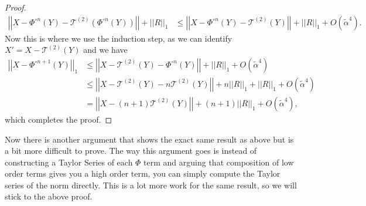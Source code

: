 \documentclass{article}
\newcommand{\norm}[1]{\left| \left| #1 \right| \right|}
\newcommand{\bigo}[1]{O\left( #1 \right)}
\begin{document}
\begin{proof}
\begin{align}
    \norm{X - \Phi^{\circ n}(Y) - \mathcal{T}^{(2)}(\Phi^{\circ n}(Y))} + \norm{R}_1 &\le \norm{X - \Phi^{\circ n}(Y) - \mathcal{T}^{(2)}(Y)} + \norm{R}_1 + \bigo{\widetilde{\alpha }^4}.
\end{align}
Now this is where we use the induction step, as we can identify $X' = X - \mathcal{T}^{(2)}(Y)$ and we have
\begin{align}
    \norm{X - \Phi^{\circ n + 1}(Y)}_1 &\le \norm{X - \mathcal{T}^{(2)}(Y) - \Phi^{\circ n}(Y) } + \norm{R}_1 + \bigo{\widetilde{\alpha }^4} \\
    &\le \norm{X - \mathcal{T}^{(2)}(Y) - n \mathcal{T}^{(2)}(Y)} + n \norm{R}_1 + \norm{R}_1 + \bigo{\widetilde{\alpha}^4} \\
    &=\norm{X - (n + 1) \mathcal{T}^{(2)}(Y)} + (n + 1) \norm{R}_1 + \bigo{\widetilde{\alpha}^4},
\end{align}
which completes the proof.
\end{proof}
Now there is another argument that shows the exact same result as above but is a bit more difficult to prove. The way this argument goes is instead of constructing a Taylor Series of each $\Phi$ term and arguing that composition of low order terms gives you a high order term, you can simply compute the Taylor series of the norm directly. This is a lot more work for the same result, so we will stick to the above proof.
\end{document}
